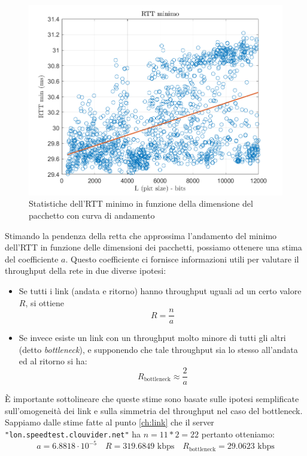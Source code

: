 \begin{figure}[H]
    \centering
    \includegraphics[width=\linewidth]{rtt fit.png}
    \caption{Statistiche dell'RTT minimo in funzione della dimensione del pacchetto con curva di andamento}
    \label{fig:risR}
\end{figure}
Stimando la pendenza della retta che approssima l'andamento del minimo dell'RTT in funzione delle dimensioni dei pacchetti, possiamo ottenere una stima del coefficiente $a$. Questo coefficiente ci fornisce informazioni utili per valutare il throughput della rete in due diverse ipotesi:
\begin{itemize}
    \item Se tutti i link (andata e ritorno) hanno throughput uguali ad un certo valore $R$, si ottiene
    \begin{equation}
        R=\frac n a
    \end{equation}
    \item Se invece esiste un link con un throughput molto minore di tutti gli altri (detto \textit{bottleneck}), e supponendo che tale throughput sia lo stesso all’andata ed al ritorno si ha:
    \begin{equation}
        R_{\text{bottleneck}}\approx \frac 2 a
    \end{equation}
\end{itemize}
\clearpage
È importante sottolineare che queste stime sono basate sulle ipotesi semplificate sull'omogeneità dei link e sulla simmetria del throughput nel caso del bottleneck. Sappiamo dalle stime fatte al punto \ref{ch:link} che il server \texttt{"lon.speedtest.clouvider.net"} ha $n=11*2=22$ pertanto otteniamo:
\begin{equation*}
    a=6.8818\cdot10^{-5}\quad R=319.6849\text{ kbps}\quad R_{\text{bottleneck}}=29.0623\text{ kbps}
\end{equation*}
